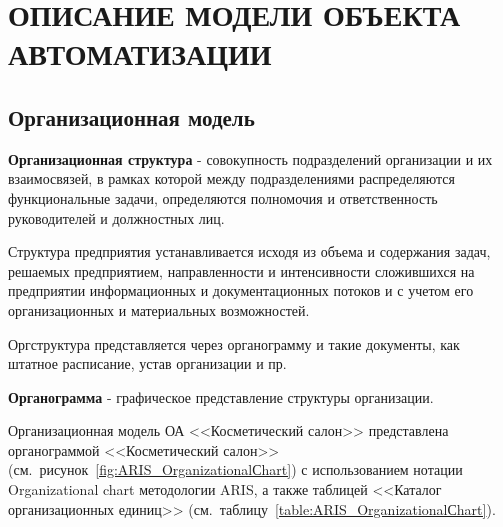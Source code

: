 \section{ОПИСАНИЕ МОДЕЛИ ОБЪЕКТА АВТОМАТИЗАЦИИ}
\subsection{Организационная модель}

\textbf{Организационная структура} - совокупность подразделений организации и их взаимосвязей,
в рамках которой между подразделениями распределяются функциональные задачи,
определяются полномочия и ответственность руководителей и должностных лиц.

Структура предприятия устанавливается исходя из объема и содержания задач,
решаемых предприятием, направленности и интенсивности сложившихся на предприятии
информационных и документационных потоков и с учетом его организационных и материальных возможностей.

Оргструктура представляется через органограмму и такие документы, как штатное расписание,
устав организации и пр.

\textbf{Органограмма} - графическое представление структуры организации.

Организационная модель ОА <<Косметический салон>> представлена органограммой <<Косметический салон>>
(см.~рисунок~\ref{fig:ARIS_OrganizationalСhart})
с использованием нотации Organizational chart методологии ARIS,
а также таблицей <<Каталог организационных единиц>>
(см.~таблицу~\ref{table:ARIS_OrganizationalСhart}).



